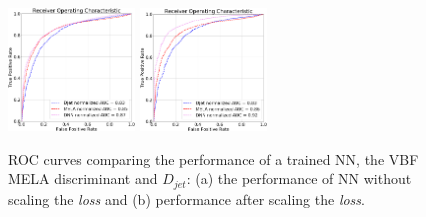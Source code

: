 \documentclass[]{report}
\begin{document}
\begin{figure}
	\centering
	\includegraphics[width=0.3\textwidth]{figs/3jets_pt_eta_phi_no_weight_vbf_vs_all_leptons_sorting_issue}
	\quad
	\quad
	\includegraphics[width=0.3\textwidth]{figs/3jets_pt_eta_phi_weight_sum_vbf_vs_all_leptons_sorting_issue}
	\caption{ROC curves comparing the performance of a trained NN, the VBF MELA discriminant and $D_{jet}$: (a) the performance of NN without scaling the \textit{loss} and (b) performance after scaling the \textit{loss}.}
	\label{fig:scaling_training_effect}
\end{figure}
\end{document}
